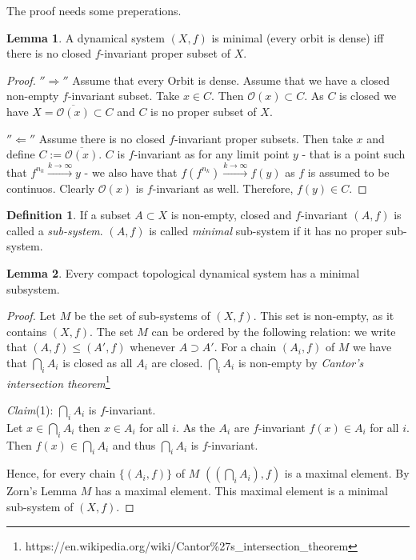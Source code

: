 \documentclass{article}
\newcommand{\subclaim}[1]{\textit{Claim}({#1}):\hspace{0,2cm}}
\renewcommand{\O}{\mathcal{O}}
\theoremstyle{definition}
\newtheorem*{silentdefn}{Definition}
\newtheorem*{silentlem}{Lemma}
\theoremstyle{plain}
\theoremstyle{remark}
\begin{document}
The proof needs some preperations.
\begin{silentlem} A dynamical system $(X,f)$ is minimal (every orbit is dense) iff there is no closed $f$-invariant proper subset of $X$.
\end{silentlem}
\begin{proof} 
		$''\Longrightarrow''$ Assume that every Orbit is dense. Assume that we have a closed non-empty $f$-invariant subset. Take $x\in C$. Then $\O(x)\subset C$. As $C$ is closed we have $X=\overline{\O(x)}\subset C$ and $C$ is no proper subset of $X$.

		$''\Longleftarrow''$ Assume there is no closed $f$-invariant proper subsets.
		Then take $x$ and define $C := \overline{\O(x)}$. $C$ is $f$-invariant as for any limit point $y$ - that is a point such that $f^{n_k} \overset{k\rightarrow\infty}{\longrightarrow} y$ -  
		we also have that $f(f^{n_k}) \overset{k\rightarrow\infty}{\longrightarrow} f(y)$ as $f$ is assumed to be continuos. Clearly $\O(x)$ is $f$-invariant as well.
		Therefore, $f(y)\in C$.
	\end{proof}
\begin{silentdefn}
	If a subset $A\subset X$ is non-empty, closed and $f$-invariant $(A,f)$ is called a \emph{sub-system}. $(A,f)$ is called \emph{minimal} sub-system if it has no proper sub-system.
\end{silentdefn}
\begin{silentlem}
	Every compact topological dynamical system has a minimal subsystem.
\end{silentlem}
\begin{proof}
	Let $M$ be the set of sub-systems of $(X,f)$. This set is non-empty, as it contains $(X,f)$. The set $M$ can be ordered by the following relation: we write that $(A,f)\leq(A',f)$ whenever $A\supset A'$. For a chain $(A_i,f)$ of $M$ we have that $\bigcap_iA_i$ is closed as all $A_i$ are closed. $\bigcap_iA_i$ is non-empty by \emph{Cantor's intersection theorem}\footnote{https://en.wikipedia.org/wiki/Cantor\%27s\_intersection\_theorem}

	\subclaim1 $\bigcap_iA_i$ is $f$-invariant. \\
	Let $x\in \bigcap_iA_i$ then $x\in A_i$ for all $i$. As the $A_i$ are $f$-invariant $f(x)\in A_i$ for all $i$. Then $f(x)\in \bigcap_iA_i$ and thus $\bigcap_iA_i$ is $f$-invariant.
		
	Hence, for every chain $\{(A_i,f)\}$ of $M$ $((\bigcap_iA_i),f)$ is a maximal element.
	By Zorn's Lemma $M$ has a maximal element. This maximal element is a minimal sub-system of $(X,f)$.
\end{proof}
\end{document}
